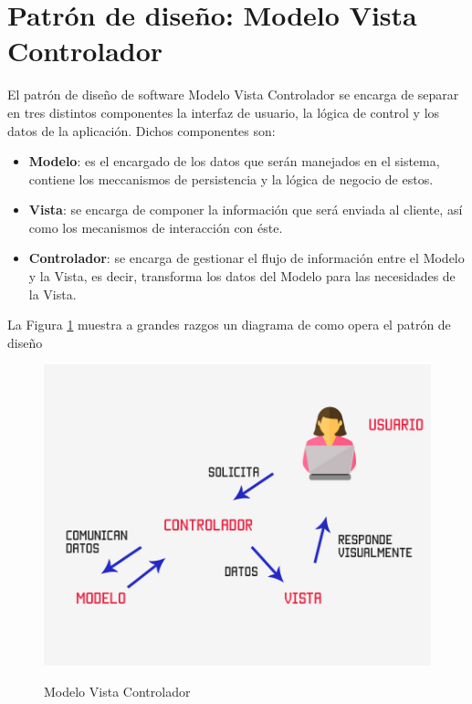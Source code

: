 \section{Patrón de diseño: Modelo Vista Controlador}
El patrón de diseño de software Modelo Vista Controlador se encarga de separar en tres distintos componentes la interfaz de usuario, la lógica de control y los datos de la aplicación. Dichos componentes son:\\

\begin{itemize}
	\item \textbf{Modelo}: es el encargado de los datos que serán manejados en el sistema, contiene los meccanismos de persistencia y la lógica de negocio de estos\cite{mvc}.\\
	
	\item \textbf{Vista}: se encarga de componer la información que será enviada al cliente, así como los mecanismos de interacción con éste\cite{mvc}.
	
	\item \textbf{Controlador}: se encarga de gestionar el flujo de información entre el Modelo y la Vista, es decir, transforma los datos del Modelo para las necesidades de la Vista.
	
\end{itemize}

La Figura \ref{fig:mvc} muestra a grandes razgos un diagrama de como opera el patrón de diseño

\begin{figure}[htbp]
	\begin{center}
		\hypertarget{fig:mvc}{
			\includegraphics[scale=.3]{propuestaSolicion/turismo/images/mvc}
			\caption{Modelo Vista Controlador\cite{mvcImagen}}
		}
		\label{fig:mvc}
	\end{center}
\end{figure}

